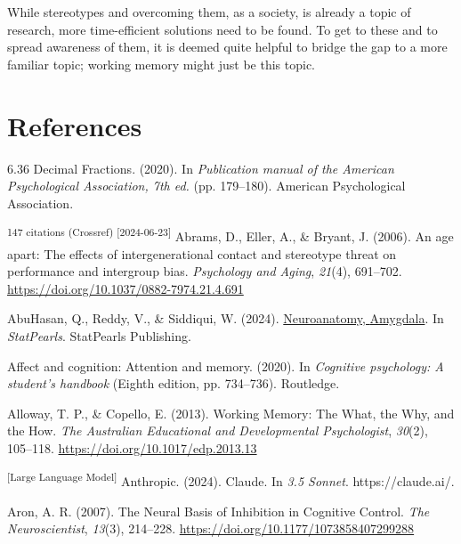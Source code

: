 \documentclass[
  stu, a4paper,floatsintext]{apa7}
\newlength{\cslhangindent}
\newenvironment{CSLReferences}[2] %
 {\begin{list}{}{%
  \setlength{\itemindent}{0pt}
  \setlength{\leftmargin}{0pt}
  \setlength{\parsep}{0pt}
  \ifodd #1
   \setlength{\leftmargin}{\cslhangindent}
   \setlength{\itemindent}{-1\cslhangindent}
  \fi
  \setlength{\itemsep}{#2\baselineskip}}}
 {\end{list}}
\begin{document}
While stereotypes and overcoming them, as a society, is already a topic of research, more time-efficient solutions need to be found. To get to these and to spread awareness of them, it is deemed quite helpful to bridge the gap to a more familiar topic; working memory might just be this topic.

\newpage

\section{References}\label{references}

\label{refs}
\begin{CSLReferences}{1}{0}
6.36 {Decimal Fractions}. (2020). In \emph{Publication manual of the {American Psychological Association}, 7th ed.} (pp. 179--180). American Psychological Association.

\textsuperscript{147 citations (Crossref) {[}2024-06-23{]}} Abrams, D., Eller, A., \& Bryant, J. (2006). An age apart: {The} effects of intergenerational contact and stereotype threat on performance and intergroup bias. \emph{Psychology and Aging}, \emph{21}(4), 691--702. \url{https://doi.org/10.1037/0882-7974.21.4.691}

AbuHasan, Q., Reddy, V., \& Siddiqui, W. (2024). \href{https://www.ncbi.nlm.nih.gov/pubmed/30725787}{Neuroanatomy, {Amygdala}}. In \emph{{StatPearls}}. StatPearls Publishing.

Affect and cognition: Attention and memory. (2020). In \emph{Cognitive psychology: A student's handbook} (Eighth edition, pp. 734--736). Routledge.

Alloway, T. P., \& Copello, E. (2013). Working {Memory}: {The What}, the {Why}, and the {How}. \emph{The Australian Educational and Developmental Psychologist}, \emph{30}(2), 105--118. \url{https://doi.org/10.1017/edp.2013.13}

\textsuperscript{{[}Large Language Model{]}} Anthropic. (2024). Claude. In \emph{3.5 Sonnet}. https://claude.ai/.

Aron, A. R. (2007). The {Neural Basis} of {Inhibition} in {Cognitive Control}. \emph{The Neuroscientist}, \emph{13}(3), 214--228. \url{https://doi.org/10.1177/1073858407299288}


\end{CSLReferences}
\end{document}
